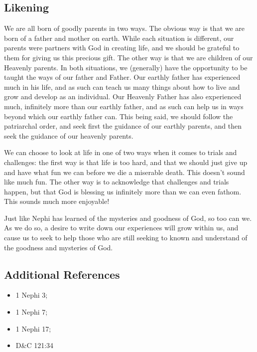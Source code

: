 \documentclass[12pt]{report}
\begin{document}
\subsection{Likening\label{1Nephi1:1:likening}}
We are all born of goodly parents in two ways.  The obvious way is that we are born of a father and mother on earth.  While each situation is different, our parents were partners with God in creating life, and we should be grateful to them for giving us this precious gift.  The other way is that we are children of our Heavenly parents.  In both situations, we (generally) have the opportunity to be taught the ways of our father and Father.  Our earthly father has experienced much in his life, and as such can teach us many things about how to live and grow and develop as an individual.  Our Heavenly Father has also experienced much, infinitely more than our earthly father, and as such can help us in ways beyond which our earthly father can.  This being said, we should follow the patriarchal order, and seek first the guidance of our earthly parents, and then seek the guidance of our heavenly parents.

We can choose to look at life in one of two ways when it comes to trials and challenges: the first way is that life is too hard, and that we should just give up and have what fun we can before we die a miserable death.  This doesn't sound like much fun.  The other way is to acknowledge that challenges and trials happen, but that God is blessing us infinitely more than we can even fathom.  This sounds much more enjoyable!

Just like Nephi has learned of the mysteries and goodness of God, so too can we.  As we do so, a desire to write down our experiences will grow within us, and cause us to seek to help those who are still seeking to known and understand of the goodness and mysteries of God.

\subsection{Additional References\label{1Nephi1:1:references}}
\begin{itemize}
\item 1 Nephi 3; 
\item 1 Nephi 7; 
\item 1 Nephi 17; 
\item D\&C 121:34
\end{itemize}
\end{document}
